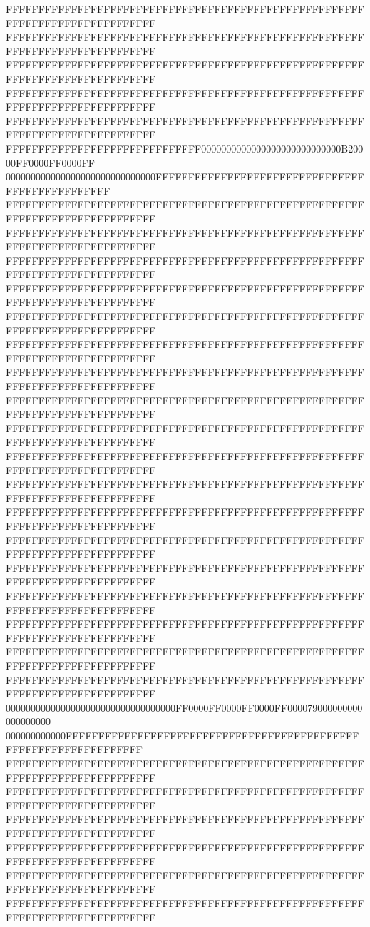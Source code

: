 FFFFFFFFFFFFFFFFFFFFFFFFFFFFFFFFFFFFFFFFFFFFFFFFFFFFFFFFFFFFFFFFFFFFFFFFFFFFFF
FFFFFFFFFFFFFFFFFFFFFFFFFFFFFFFFFFFFFFFFFFFFFFFFFFFFFFFFFFFFFFFFFFFFFFFFFFFFFF
FFFFFFFFFFFFFFFFFFFFFFFFFFFFFFFFFFFFFFFFFFFFFFFFFFFFFFFFFFFFFFFFFFFFFFFFFFFFFF
FFFFFFFFFFFFFFFFFFFFFFFFFFFFFFFFFFFFFFFFFFFFFFFFFFFFFFFFFFFFFFFFFFFFFFFFFFFFFF
FFFFFFFFFFFFFFFFFFFFFFFFFFFFFFFFFFFFFFFFFFFFFFFFFFFFFFFFFFFFFFFFFFFFFFFFFFFFFF
FFFFFFFFFFFFFFFFFFFFFFFFFFFFFF0000000000000000000000000000B20000FF0000FF0000FF
000000000000000000000000000000FFFFFFFFFFFFFFFFFFFFFFFFFFFFFFFFFFFFFFFFFFFFFFFF
FFFFFFFFFFFFFFFFFFFFFFFFFFFFFFFFFFFFFFFFFFFFFFFFFFFFFFFFFFFFFFFFFFFFFFFFFFFFFF
FFFFFFFFFFFFFFFFFFFFFFFFFFFFFFFFFFFFFFFFFFFFFFFFFFFFFFFFFFFFFFFFFFFFFFFFFFFFFF
FFFFFFFFFFFFFFFFFFFFFFFFFFFFFFFFFFFFFFFFFFFFFFFFFFFFFFFFFFFFFFFFFFFFFFFFFFFFFF
FFFFFFFFFFFFFFFFFFFFFFFFFFFFFFFFFFFFFFFFFFFFFFFFFFFFFFFFFFFFFFFFFFFFFFFFFFFFFF
FFFFFFFFFFFFFFFFFFFFFFFFFFFFFFFFFFFFFFFFFFFFFFFFFFFFFFFFFFFFFFFFFFFFFFFFFFFFFF
FFFFFFFFFFFFFFFFFFFFFFFFFFFFFFFFFFFFFFFFFFFFFFFFFFFFFFFFFFFFFFFFFFFFFFFFFFFFFF
FFFFFFFFFFFFFFFFFFFFFFFFFFFFFFFFFFFFFFFFFFFFFFFFFFFFFFFFFFFFFFFFFFFFFFFFFFFFFF
FFFFFFFFFFFFFFFFFFFFFFFFFFFFFFFFFFFFFFFFFFFFFFFFFFFFFFFFFFFFFFFFFFFFFFFFFFFFFF
FFFFFFFFFFFFFFFFFFFFFFFFFFFFFFFFFFFFFFFFFFFFFFFFFFFFFFFFFFFFFFFFFFFFFFFFFFFFFF
FFFFFFFFFFFFFFFFFFFFFFFFFFFFFFFFFFFFFFFFFFFFFFFFFFFFFFFFFFFFFFFFFFFFFFFFFFFFFF
FFFFFFFFFFFFFFFFFFFFFFFFFFFFFFFFFFFFFFFFFFFFFFFFFFFFFFFFFFFFFFFFFFFFFFFFFFFFFF
FFFFFFFFFFFFFFFFFFFFFFFFFFFFFFFFFFFFFFFFFFFFFFFFFFFFFFFFFFFFFFFFFFFFFFFFFFFFFF
FFFFFFFFFFFFFFFFFFFFFFFFFFFFFFFFFFFFFFFFFFFFFFFFFFFFFFFFFFFFFFFFFFFFFFFFFFFFFF
FFFFFFFFFFFFFFFFFFFFFFFFFFFFFFFFFFFFFFFFFFFFFFFFFFFFFFFFFFFFFFFFFFFFFFFFFFFFFF
FFFFFFFFFFFFFFFFFFFFFFFFFFFFFFFFFFFFFFFFFFFFFFFFFFFFFFFFFFFFFFFFFFFFFFFFFFFFFF
FFFFFFFFFFFFFFFFFFFFFFFFFFFFFFFFFFFFFFFFFFFFFFFFFFFFFFFFFFFFFFFFFFFFFFFFFFFFFF
FFFFFFFFFFFFFFFFFFFFFFFFFFFFFFFFFFFFFFFFFFFFFFFFFFFFFFFFFFFFFFFFFFFFFFFFFFFFFF
FFFFFFFFFFFFFFFFFFFFFFFFFFFFFFFFFFFFFFFFFFFFFFFFFFFFFFFFFFFFFFFFFFFFFFFFFFFFFF
0000000000000000000000000000000000FF0000FF0000FF0000FF000079000000000000000000
000000000000FFFFFFFFFFFFFFFFFFFFFFFFFFFFFFFFFFFFFFFFFFFFFFFFFFFFFFFFFFFFFFFFFF
FFFFFFFFFFFFFFFFFFFFFFFFFFFFFFFFFFFFFFFFFFFFFFFFFFFFFFFFFFFFFFFFFFFFFFFFFFFFFF
FFFFFFFFFFFFFFFFFFFFFFFFFFFFFFFFFFFFFFFFFFFFFFFFFFFFFFFFFFFFFFFFFFFFFFFFFFFFFF
FFFFFFFFFFFFFFFFFFFFFFFFFFFFFFFFFFFFFFFFFFFFFFFFFFFFFFFFFFFFFFFFFFFFFFFFFFFFFF
FFFFFFFFFFFFFFFFFFFFFFFFFFFFFFFFFFFFFFFFFFFFFFFFFFFFFFFFFFFFFFFFFFFFFFFFFFFFFF
FFFFFFFFFFFFFFFFFFFFFFFFFFFFFFFFFFFFFFFFFFFFFFFFFFFFFFFFFFFFFFFFFFFFFFFFFFFFFF
FFFFFFFFFFFFFFFFFFFFFFFFFFFFFFFFFFFFFFFFFFFFFFFFFFFFFFFFFFFFFFFFFFFFFFFFFFFFFF
